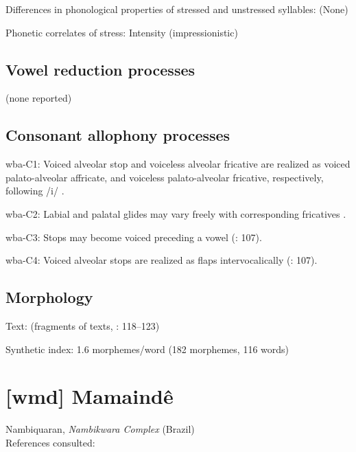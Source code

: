 {\begin{appendixdesc}
\item[Differences in phonological properties of stressed and unstressed syllables:] (None)

\item[Phonetic correlates of stress:] Intensity (impressionistic)
\end{appendixdesc}
\subsection*{Vowel reduction processes}

(none reported)
\subsection*{Consonant allophony processes}
\begin{appendixdesc}

\item[wba-C1:] Voiced alveolar stop and voiceless alveolar fricative are realized as voiced palato-alveolar affricate, and voiceless palato-alveolar fricative, respectively, following /i/ \citep[121]{Arinterol2000}.

\item[wba-C2:] Labial and palatal glides may vary freely with corresponding fricatives \citep[122]{Arinterol2000}.

\item[wba-C3:] Stops may become voiced preceding a vowel (\citealt{Romero-Figeroa1997}: 107).

\item[wba-C4:] Voiced alveolar stops are realized as flaps intervocalically (\citealt{Romero-Figeroa1997}: 107).
\end{appendixdesc}
\subsection*{Morphology}

\begin{appendixdesc}

\item[Text:] (fragments of texts, \citealt{Romero-Figeroa1997}: 118--123)

\item[Synthetic index:] 1.6 morphemes/word (182 morphemes, 116 words)
\end{appendixdesc}

\section*{[wmd] Mamaindê} %
Nambiquaran, \textit{Nambikwara Complex} (Brazil)\medskip\\
References consulted: \citet{Eberhard2009}

}
